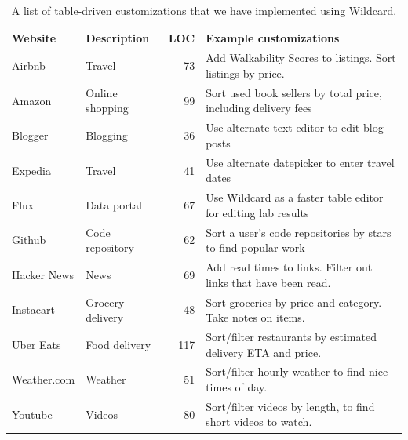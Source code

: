 \documentclass[sigplan,screen,10pt,anonymous,review]{acmart}
\begin{document}
\begin{table}[]
\begin{tabular}{llrl}
\hline
\textbf{Website} & \textbf{Description} & \textbf{LOC} & \textbf{Example customizations}                                                              \\ \hline
Airbnb           & Travel               & 73                                       & Add Walkability Scores to listings. Sort listings by price.                           \\
Amazon           & Online shopping      & 99                                       & Sort used book sellers by total price, including delivery fees                                \\
Blogger          & Blogging             & 36                                       & Use alternate text editor to edit blog posts                                                 \\
Expedia          & Travel               & 41                                       & Use alternate datepicker to enter travel dates                                               \\
Flux             & Data portal          & 67                                       & Use Wildcard as a faster table editor for editing lab results                                \\
Github           & Code repository      & 62                                       & Sort a user's code repositories by stars to find popular work                                \\
Hacker News      & News                 & 69                                       & Add read times to links. Filter out links that have been read. \\
Instacart        & Grocery delivery     & 48                                       & Sort groceries by price and category. Take notes on items.                                   \\
Uber Eats        & Food delivery        & 117                                      & Sort/filter restaurants by estimated delivery ETA and price.                                 \\
Weather.com  & Weather              & 51                                       & Sort/filter hourly weather to find nice times of day.                                        \\
Youtube          & Videos               & 80                                       & Sort/filter videos by length, to find short videos to watch.                                 \\ \hline
\end{tabular}
\caption{A list of table-driven customizations that we have implemented using Wildcard.}
\label{tab:websites}
\end{table}
\end{document}
